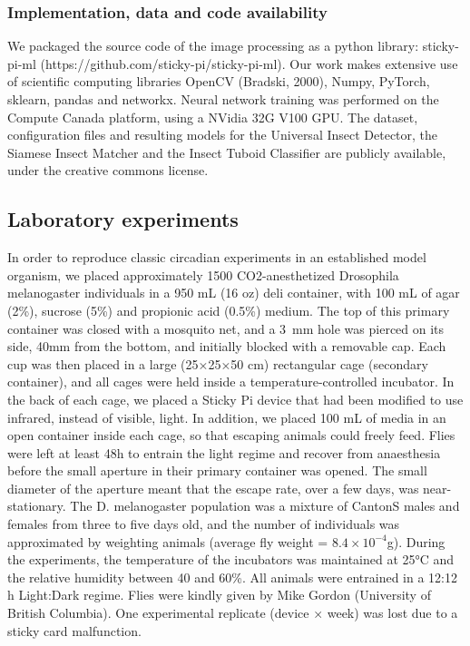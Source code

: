 \documentclass[12pt]{article}
\begin{document}
\begin{linenumbers}
		\subsubsection*{Implementation, data and code availability}
		We packaged the source code of the image processing as a python library: sticky-pi-ml (https://github.com/sticky-pi/sticky-pi-ml). Our work makes extensive use of scientific computing libraries OpenCV (Bradski, 2000), Numpy\cite{harris_array_2020}, PyTorch\cite{paszke_pytorch_2019}, sklearn\cite{pedregosa_scikit-learn_2011}, pandas\cite{the_pandas_development_team_pandas-devpandas_2020} and networkx\cite{hagberg_exploring_2008}. Neural network training was performed on the Compute Canada platform, using a NVidia 32G V100 GPU. The dataset, configuration files and resulting models for the Universal Insect Detector, the Siamese Insect Matcher and the Insect Tuboid Classifier are publicly available, under the creative commons license\cite{geissmann_sticky_2022}. 
		
		\subsection*{Laboratory experiments}
		In order to reproduce classic circadian experiments in an established model organism, we placed approximately 1500 CO2-anesthetized Drosophila melanogaster individuals in a 950 mL (16 oz) deli container, with 100 mL of agar (2\%), sucrose (5\%) and propionic acid (0.5\%) medium. The top of this primary container was closed with a mosquito net, and a 3~mm hole was pierced on its side, 40mm from the bottom, and initially blocked with a removable cap. Each cup was then placed in a large (25×25×50 cm) rectangular cage (secondary container), and all cages were held inside a temperature-controlled incubator. In the back of each cage, we placed a Sticky Pi device that had been modified to use infrared, instead of visible, light. In addition, we placed 100 mL of media in an open container inside each cage, so that escaping animals could freely feed. Flies were left at least 48h to entrain the light regime and recover from anaesthesia before the small aperture in their primary container was opened. The small diameter of the aperture meant that the escape rate, over a few days, was near-stationary.
		The D. melanogaster population was a mixture of CantonS males and females from three to five days old, and the number of individuals was approximated by weighting animals (average fly weight = $8.4×10^{-4}$g). During the experiments, the temperature of the incubators was maintained at 25°C and the relative humidity between 40 and 60\%. All animals were entrained in a 12:12 h Light:Dark regime. Flies were kindly given by Mike Gordon (University of British Columbia). One experimental replicate (device × week) was lost due to a sticky card malfunction.
		

\end{linenumbers}
\end{document}
